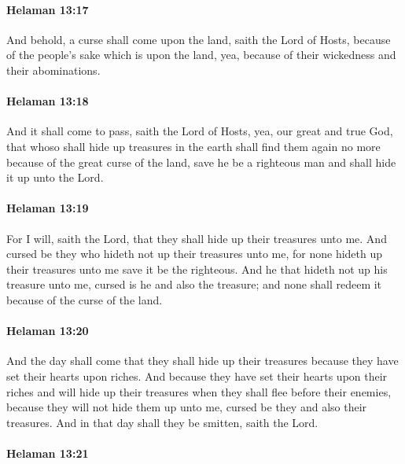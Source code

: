 		\paragraph{Helaman 13:17} %
			\label{HELAMAN-13-17}

			And behold, a curse shall come upon the land, saith the Lord of Hosts,
			because of the people's sake which is upon the land,
			yea, because of their wickedness and their abominations.

		\paragraph{Helaman 13:18} %
			\label{HELAMAN-13-18}

			And it shall come to pass, saith the Lord of Hosts,
			yea, our great and true God,
			that whoso shall hide up treasures in the earth
			shall find them again no more because of the great curse of the land,
			save he be a righteous man and shall hide it up unto the Lord.

		\paragraph{Helaman 13:19} %
			\label{HELAMAN-13-19}

			For I will, saith the Lord, that they shall hide up their treasures unto me.
			And cursed be they who hideth not up their treasures unto me,
			for none hideth up their treasures unto me save it be the righteous.
			And he that hideth not up his treasure unto me,
			cursed is he and also the treasure;
			and none shall redeem it because of the curse of the land.

		\paragraph{Helaman 13:20} %
			\label{HELAMAN-13-20}

			And the day shall come that they shall hide up their treasures
			because they have set their hearts upon riches.
			And because they have set their hearts upon their riches
			and will hide up their treasures when they shall flee before their enemies,
			because they will not hide them up unto me,
			cursed be they and also their treasures.
			And in that day shall they be smitten, saith the Lord.

		\paragraph{Helaman 13:21} %
			\label{HELAMAN-13-21}

